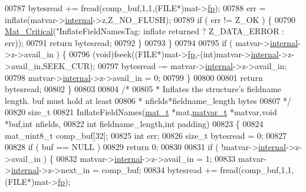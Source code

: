 \begin{DoxyCode}
{{{{{{{{{{{{{{{{{{{{{{{{{00787         bytesread += fread(comp\_buf,1,1,(FILE*)mat->\hyperlink{struct__mat__t_a85f562e407ca9ad4d2a6e14f839432b7}{fp});
00788         err = inflate(matvar->\hyperlink{group___m_a_t_a6e97e3ed9f40c49322c18561c2a94e92}{internal}->z,Z\_NO\_FLUSH);
00789         \textcolor{keywordflow}{if} ( err != Z\_OK ) \{
00790             \hyperlink{group__mat__util_gaf51f2bfbb5580f575e4dd79757e2b80c}{Mat\_Critical}(\textcolor{stringliteral}{"InflateFieldNamesTag: inflate returned %
      ? Z\_DATA\_ERROR : err));
00791             \textcolor{keywordflow}{return} bytesread;
00792         \}
00793     \}
00794 
00795     \textcolor{keywordflow}{if} ( matvar->\hyperlink{group___m_a_t_a6e97e3ed9f40c49322c18561c2a94e92}{internal}->z->avail\_in ) \{
00796         (void)fseek((FILE*)mat->\hyperlink{struct__mat__t_a85f562e407ca9ad4d2a6e14f839432b7}{fp},-(int)matvar->\hyperlink{group___m_a_t_a6e97e3ed9f40c49322c18561c2a94e92}{internal}->z->avail\_in,SEEK\_CUR);
00797         bytesread -= matvar->\hyperlink{group___m_a_t_a6e97e3ed9f40c49322c18561c2a94e92}{internal}->z->avail\_in;
00798         matvar->\hyperlink{group___m_a_t_a6e97e3ed9f40c49322c18561c2a94e92}{internal}->z->avail\_in = 0;
00799     \}
00800 
00801     \textcolor{keywordflow}{return} bytesread;
00802 \}
00803 
00804 \textcolor{comment}{/*}
00805 \textcolor{comment}{ * Inflates the structure's fieldname length.  buf must hold at least}
00806 \textcolor{comment}{ * nfields*fieldname\_length bytes}
00807 \textcolor{comment}{ */}
00820 \textcolor{keywordtype}{size\_t}
00821 InflateFieldNames(\hyperlink{struct__mat__t}{mat\_t} *mat,\hyperlink{group___m_a_t_structmatvar__t}{matvar\_t} *matvar,\textcolor{keywordtype}{void} *buf,\textcolor{keywordtype}{int} nfields,
00822                   \textcolor{keywordtype}{int} fieldname\_length,\textcolor{keywordtype}{int} padding)
00823 \{
00824     mat\_uint8\_t comp\_buf[32];
00825     \textcolor{keywordtype}{int}    err;
00826     \textcolor{keywordtype}{size\_t} bytesread = 0;
00827 
00828     \textcolor{keywordflow}{if} ( buf == NULL )
00829         \textcolor{keywordflow}{return} 0;
00830 
00831     \textcolor{keywordflow}{if} ( !matvar->\hyperlink{group___m_a_t_a6e97e3ed9f40c49322c18561c2a94e92}{internal}->z->avail\_in ) \{
00832         matvar->\hyperlink{group___m_a_t_a6e97e3ed9f40c49322c18561c2a94e92}{internal}->z->avail\_in = 1;
00833         matvar->\hyperlink{group___m_a_t_a6e97e3ed9f40c49322c18561c2a94e92}{internal}->z->next\_in = comp\_buf;
00834         bytesread += fread(comp\_buf,1,1,(FILE*)mat->\hyperlink{struct__mat__t_a85f562e407ca9ad4d2a6e14f839432b7}{fp});
}}}}}}}}}}}}}}}}}}}}}}}}}}
\end{DoxyCode}
